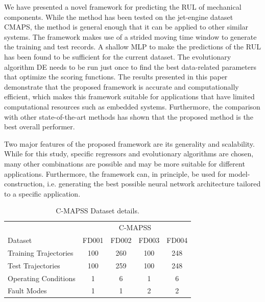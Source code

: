 \documentclass[12pt]{IEEEtran}%
\begin{document}
\label{sec:conclusions}

We have presented a novel framework for predicting the RUL of mechanical
components. While the method has been tested on the jet-engine dataset
CMAPS, the method is general enough that it can be applied to other similar
systems. The framework makes use of a strided moving time window to generate
the training and test records. A shallow MLP to make the predictions of the RUL
has been found to be sufficient for the current dataset. The evolutionary
algorithm DE needs to be run just once to find the best data-related
parameters that optimize the scoring functions. The results presented in this
paper demonstrate that the proposed framework is accurate and computationally
efficient, which makes this framework suitable for applications that have
limited computational resources such as embedded systems. Furthermore, the
comparison with other state-of-the-art methods has shown that the proposed
method is the best overall performer.

Two major features of the proposed framework are its generality and
scalability. While for this study, specific regressors and evolutionary
algorithms are chosen, many other combinations are possible and may be more
suitable for different applications. Furthermore, the framework can, in
principle, be used for model-construction, i.e. generating the best possible
neural network architecture tailored to a specific application.



%

%


\clearpage


\onecolumn%

\begin{table}
\begin{center}
\caption{C-MAPSS Dataset details.}%
%

\begin{tabular}
[c]{l|cccc}\hline
& \multicolumn{4}{c}{C-MAPSS}\\
Dataset & FD001 & FD002 & FD003 & FD004\\\hline\hline
Training Trajectories & 100 & 260 & 100 & 248\\
Test Trajectories & 100 & 259 & 100 & 248\\
Operating Conditions & 1 & 6 & 1 & 6\\
Fault Modes & 1 & 1 & 2 & 2\\\hline
\end{tabular}
\label{TabCMAPSS}%

\end{center}
\end{table}
%
\end{document}
